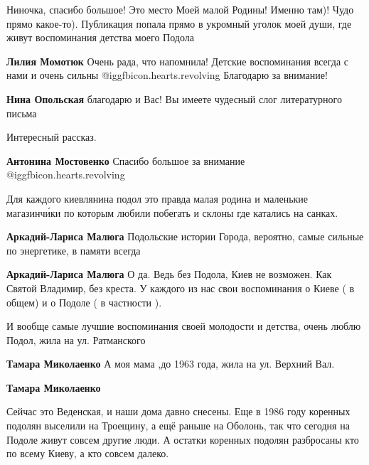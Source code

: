 \begin{itemize}

Ниночка, спасибо большое! Это место Моей малой Родины! Именно там)! Чудо прямо какое-то). Публикация попала прямо в укромный уголок моей души, где живут воспоминания детства моего Подола

\begin{itemize} %
\textbf{Лилия Момотюк} Очень рада, что напомнила! Детские воспоминания всегда с нами и очень сильны @igg{fbicon.hearts.revolving}  Благодарю за внимание!

\textbf{Нина Опольская} благодарю и Вас! Вы имеете чудесный слог литературного письма
\end{itemize} %

Интересный рассказ.

\begin{itemize} %
\textbf{Антонина Мостовенко} Спасибо большое за внимание @igg{fbicon.hearts.revolving} 
\end{itemize} %


Для каждого киевлянина подол это правда малая родина и маленькие магазинчи́ки по
которым любили побегать и склоны где катались на санках.

\begin{itemize} %
\textbf{Аркадий-Лариса Малюга} Подольские истории Города, вероятно, самые сильные по энергетике, в памяти всегда

\textbf{Аркадий-Лариса Малюга}
О да.
Ведь без Подола, Киев не возможен.
Как Святой Владимир, без креста.
У каждого из нас свои воспоминания о Киеве ( в общем) и о Подоле ( в частности ).
\end{itemize} %


И вообще самые лучшие воспоминания своей молодости и детства, очень люблю
Подол, жила на ул. Ратманского

\begin{itemize} %
\textbf{Тамара Миколаенко}
А моя мама ,до 1963 года, жила на ул. Верхний Вал.

\textbf{Тамара Миколаенко} 

Сейчас это Веденская, и наши дома давно снесены. Еще в 1986 году коренных подолян
выселили на Троещину, а ещё раньше на Оболонь, так что сегодня на Подоле живут
совсем другие люди. А остатки коренных подолян разбросаны кто по всему Киеву, а
кто совсем далеко.


\end{itemize}
\end{itemize}
